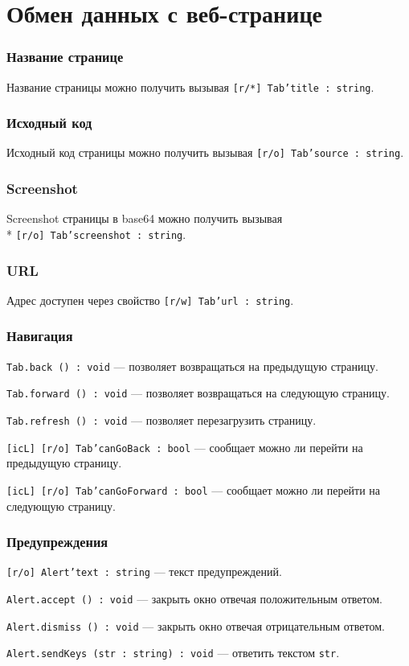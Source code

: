 \section{Обмен данных с веб-странице}
\label{dataexchange}

\subsubsection{Название странице}

Название страницы можно получить вызывая \texttt{[r/*] Tab'title : string}.

\subsubsection{Исходный код}

Исходный код страницы можно получить вызывая \texttt{[r/o] Tab'source : string}.

\subsubsection{Screenshot}

Screenshot страницы в base64 можно получить вызывая\\* \texttt{[r/o] Tab'screenshot : string}.

\subsubsection{URL}

Адрес доступен через свойство \texttt{[r/w] Tab'url : string}.

\subsubsection{Навигация}

\texttt{Tab.back () : void} — позволяет возвращаться на предыдущую страницу.

\texttt{Tab.forward () : void} — позволяет возвращаться на следующую страницу.

\texttt{Tab.refresh () : void} —  позволяет перезагрузить страницу.

\texttt{[icL] [r/o] Tab'canGoBack : bool} — сообщает можно ли перейти на предыдущую страницу.

\texttt{[icL] [r/o] Tab'canGoForward : bool} — сообщает можно ли перейти на следующую страницу.


\subsubsection{Предупреждения}

\texttt{[r/o] Alert'text : string} — текст предупреждений.

\texttt{Alert.accept () : void} — закрыть окно отвечая положительным ответом.

\texttt{Alert.dismiss () : void} — закрыть окно отвечая отрицательным ответом.

\texttt{Alert.sendKeys (str : string) : void} — ответить текстом \texttt{str}.

